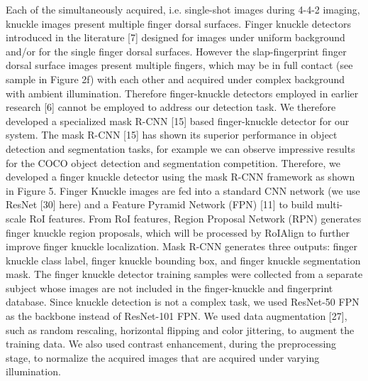 Each of the simultaneously acquired, i.e. single-shot images during 4-4-2 imaging, knuckle images present multiple finger dorsal surfaces. Finger knuckle detectors introduced in the literature [7] designed for images under uniform background and/or for the single finger dorsal surfaces. However the slap-fingerprint finger dorsal surface images present multiple fingers, which may be in full contact (see sample in Figure 2f) with each other and acquired under complex background with ambient illumination. Therefore finger-knuckle detectors employed in earlier research [6] cannot be employed to address our detection task. We therefore developed a specialized mask R-CNN [15] based finger-knuckle detector for our system. The mask R-CNN [15] has shown its superior performance in object detection and segmentation tasks, for example we can observe impressive results for the COCO object detection and segmentation competition. Therefore, we developed a finger knuckle detector using the mask R-CNN framework as shown in Figure 5. Finger Knuckle images are fed into a standard CNN network (we use ResNet [30] here) and a Feature Pyramid Network (FPN) [11] to build multi-scale RoI features. From RoI features, Region Proposal Network (RPN) generates finger knuckle region proposals, which will be processed by RoIAlign to further improve finger knuckle localization. Mask R-CNN generates three outputs: finger knuckle class label, finger knuckle bounding box, and finger knuckle segmentation mask. The finger knuckle detector training samples were collected from a separate subject whose images are not included in the finger-knuckle and fingerprint database. Since knuckle detection is not a complex task, we used ResNet-50 FPN as the backbone instead of ResNet-101 FPN. We used data augmentation [27], such as random rescaling, horizontal flipping and color jittering, to augment the training data. We also used contrast enhancement, during the preprocessing stage, to normalize the acquired images that are acquired under varying illumination. 

